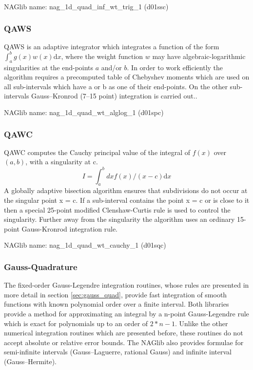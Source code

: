 NAGlib name: nag\_1d\_quad\_inf\_wt\_trig\_1 (d01ssc) \cite{nag_d01ssc}



\subsubsection{QAWS}
QAWS is an adaptive integrator which integrates a function of the form $\int_a^b g(x) w(x) \mathrm{d}x$, where the weight function $w$ may have algebraic-logarithmic singularities at the end-points $a$ and/or $b$\cite{quadpack}. In order to work efficiently the algorithm requires a precomputed table of Chebyshev moments which are used on all sub-intervals which have a or b as one of their end-points. On the other sub-intervals Gauss–Kronrod (7–15 point) integration is carried out.\cite{GSL_Reference, nag_d01spc}.

NAGlib name: nag\_1d\_quad\_wt\_alglog\_1 (d01spc) \cite{nag_d01spc}


\subsubsection{QAWC}
QAWC computes the Cauchy principal value of the integral of $f(x)$ over $(a,b)$, with a singularity at c. \cite{quadpack}
\begin{equation}
I = \int_a^b dx f(x) / (x - c) \mathrm{d}x
\label{eq:qawc}
\end{equation}
A globally adaptive bisection algorithm ensures that subdivisions do not occur at the singular point x = c. If  a sub-interval contains the point x = c or is close to it then a special 25-point modified Clenshaw-Curtis rule is used to control the singularity. Further away from the singularity the algorithm uses an ordinary 15-point Gauss-Kronrod integration rule. \cite{GSL_Reference}

NAGlib name: nag\_1d\_quad\_wt\_cauchy\_1 (d01sqc) \cite{nag_d01sqc}



\subsubsection{Gauss-Quadrature}
The fixed-order Gauss-Legendre integration routines, whose rules are presented in more detail in section \ref{sec:gauss_quad}, provide fast integration of smooth functions with known polynomial order over a finite interval. Both libraries provide a method for approximating an integral by a n-point Gauss-Legendre rule which is exact for polynomials up to an order of $2*n-1$. Unlike the other numerical integration routines which are presented before, these routines do not accept absolute or relative error bounds. \cite{nag_d01tac, GSL_Reference} \newline
The NAGlib also provides formulae for semi-infinite intervals (Gauss–Laguerre, rational Gauss) and infinite interval (Gauss–Hermite). \cite{nag_d01tac}



